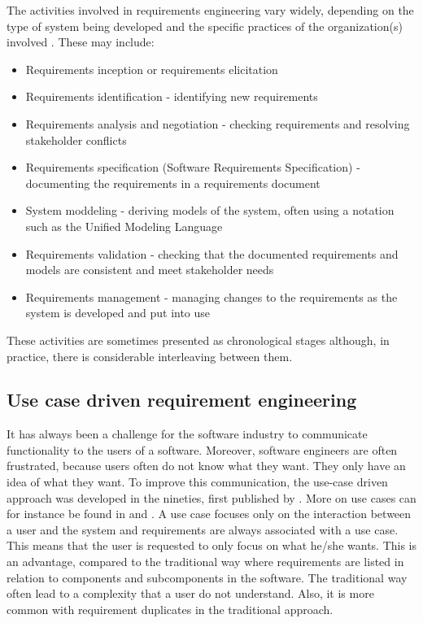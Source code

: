 \documentclass[11pt, oneside]{article}   	%
\begin{document}
The activities involved in requirements engineering vary widely, depending on the type of system being developed and the specific practices of the organization(s) involved  \cite{Som11}.  These may include:
\begin{itemize}
\item Requirements inception or requirements elicitation 
\item Requirements identification - identifying new requirements
\item Requirements analysis and negotiation - checking requirements and resolving stakeholder conflicts
\item Requirements specification (Software Requirements Specification) - documenting the requirements in a requirements document
\item System moddeling - deriving models of the system, often using a notation such as the Unified Modeling Language
\item Requirements validation - checking that the documented requirements and models are consistent and meet stakeholder needs
\item Requirements management - managing changes to the requirements as the system is developed and put into use
\end{itemize}

These activities are sometimes presented as chronological stages although, in practice, there is considerable interleaving between them.  

\subsection{Use case driven requirement engineering}

It has always been a challenge for the software industry to communicate functionality to the users of a software. Moreover, software engineers are often frustrated, because users often do not know what they want. They only have an idea of what they want.  To improve this communication, the use-case driven approach was developed in the nineties, first published by  \cite{Jac92}.  More on use cases can for instance be found in \cite{Poh10} and \cite{Coc01}.  A use case focuses only on the interaction between a user and the system and requirements are always associated with a use case. This means that the user is requested to only focus on what he/she wants.  This is an advantage, compared to the traditional way where requirements are listed in relation to components and subcomponents in the software.  The traditional way often lead to a complexity that a user do not understand.  Also, it is more common with requirement duplicates in the traditional approach.
\end{document}
